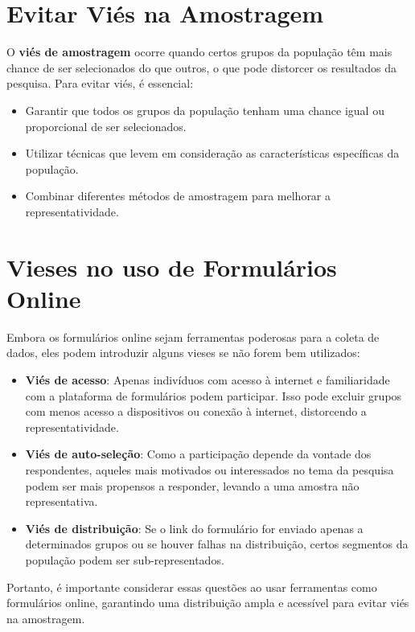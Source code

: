 \documentclass[
]{book}
\providecommand{\tightlist}{%
  \setlength{\itemsep}{0pt}\setlength{\parskip}{0pt}}
\begin{document}
\section{Evitar Viés na Amostragem}\label{evitar-viuxe9s-na-amostragem}

O \textbf{viés de amostragem} ocorre quando certos grupos da população têm mais chance de ser selecionados do que outros, o que pode distorcer os resultados da pesquisa. Para evitar viés, é essencial:

\begin{itemize}
\tightlist
\item
  Garantir que todos os grupos da população tenham uma chance igual ou proporcional de ser selecionados.
\item
  Utilizar técnicas que levem em consideração as características específicas da população.
\item
  Combinar diferentes métodos de amostragem para melhorar a representatividade.
\end{itemize}

\section{Vieses no uso de Formulários Online}\label{vieses-no-uso-de-formuluxe1rios-online}

Embora os formulários online sejam ferramentas poderosas para a coleta de dados, eles podem introduzir alguns vieses se não forem bem utilizados:

\begin{itemize}
\tightlist
\item
  \textbf{Viés de acesso}: Apenas indivíduos com acesso à internet e familiaridade com a plataforma de formulários podem participar. Isso pode excluir grupos com menos acesso a dispositivos ou conexão à internet, distorcendo a representatividade.
\item
  \textbf{Viés de auto-seleção}: Como a participação depende da vontade dos respondentes, aqueles mais motivados ou interessados no tema da pesquisa podem ser mais propensos a responder, levando a uma amostra não representativa.
\item
  \textbf{Viés de distribuição}: Se o link do formulário for enviado apenas a determinados grupos ou se houver falhas na distribuição, certos segmentos da população podem ser sub-representados.
\end{itemize}

Portanto, é importante considerar essas questões ao usar ferramentas como formulários online, garantindo uma distribuição ampla e acessível para evitar viés na amostragem.
\end{document}
